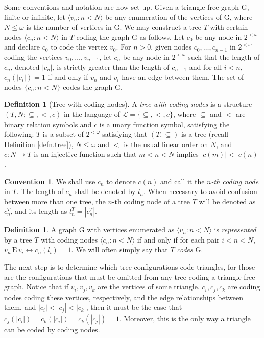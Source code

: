 \documentclass{amsart}
\theoremstyle{remark}
\theoremstyle{definition}
\newtheorem{defn}[thm]{Definition}
\newtheorem{conv}[thm]{Convention}
\theoremstyle{remark}
\newcommand{\om}{\omega}
\newcommand{\sse}{\subseteq}
\newcommand{\G}{\mathrm{G}}
\newcommand{\E}{\mathrm{E}}
\newcommand{\ra}{\rightarrow}
\newcommand{\lgl}{\langle}
\newcommand{\rgl}{\rangle}
\begin{document}
Some conventions and notation are now set up.
Given a triangle-free graph $\G$, finite or infinite,
let  $\lgl v_n:n<N\rgl$ be any enumeration of
the vertices of $\G$, where $N\le \om$ is the number of  vertices in $\G$.
We may construct a tree $T$ with  certain  nodes $\lgl c_n:n<N\rgl$  in $T$ coding the graph $\G$ as follows.
Let  $c_0$  be any node  in $2^{<\om}$
and declare $c_0$ to
code the vertex $v_0$.
For  $n>0$,
given  nodes $c_0,\dots,c_{n-1}$  in $2^{<\om}$ coding the vertices $v_0,\dots,v_{n-1}$,
let $c_n$ be any node in $2^{<\om}$  such that
 the length of $c_n$, denoted
$|c_n|$,
 is strictly greater than the length of $c_{n-1}$
 and
 for all $i< n$,
$c_n(|c_i|)=1$
 if and only if
$v_n$ and $ v_i$ have an edge between them.
The set  of nodes $\{c_n:n<N\}$ codes the graph $\G$.




\begin{defn}[Tree with coding nodes]\label{defn.treewcodingnodes}
A {\em tree with coding nodes}
is a structure $(T,N;\sse,<,c)$ in the language of
$\mathcal{L}=\{\sse,<,c\}$,
 where $\sse$ and $<$ are binary relation symbols  and $c$ is a unary function symbol,
 satisfying the following:
 $T$ is a subset of  $2^{<\om}$ satisfying that   $(T,\sse)$ is a tree (recall Definition \ref{defn.tree}), $N\le \om$ and $<$ is the usual linear order on $N$,  and $c:N\ra T$ is an injective  function such that  $m<n<N$ implies $|c(m)|<|c(n)|$.
\end{defn}



\begin{conv}\label{convention.l_n}
We shall use $c_n$ to denote $c(n)$ and call it the {\em $n$-th coding node} in $T$.
The length of $c_n$ shall be denoted by $l_n$.
When necessary to avoid confusion between more than one tree, the $n$-th coding node of a tree $T$ will be
denoted as $c^T_n$,  and its length as $l^T_n=|c^T_n|$.
\end{conv}



\begin{defn}\label{def.rep}
A graph $\G$ with vertices enumerated as $\lgl v_n:n<N\rgl$ is {\em  represented}  by a tree $T$ with  coding nodes $\lgl c_n:n<N\rgl$
if and only if
for each pair $i<n<N$,
 $v_n\, \E\, v_i\longleftrightarrow  c_n(l_i)=1$.
We will often simply say that $T$ {\em codes} $\G$.
\end{defn}


The next step is to determine which tree configurations code triangles, for those
 are the configurations that must  be omitted from any tree coding  a triangle-free graph.
Notice  that if $v_i,v_j,v_k$ are the vertices of some triangle, $c_i,c_j,c_k$ are coding nodes
coding these vertices, respectively, and the edge relationships between them,
and  $|c_i|<|c_j|<|c_k|$,
then  it must be the case that $c_j(|c_i|)=c_k(|c_i|)=c_k(|c_j|)=1$.
Moreover,  this is the only way a triangle can be coded by coding nodes.
\end{document}
